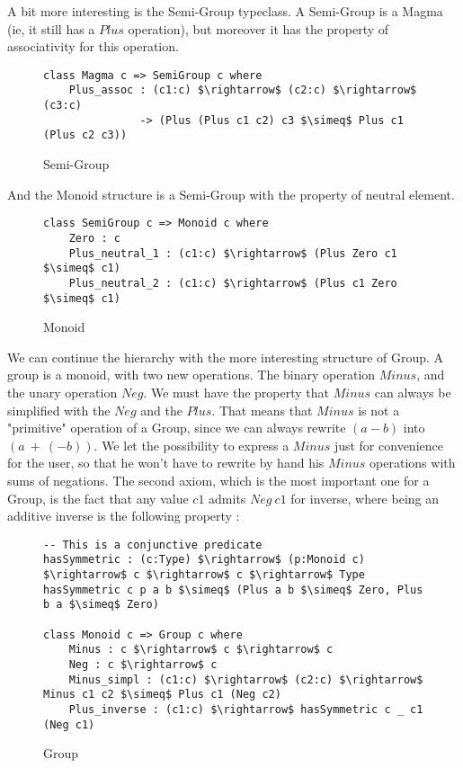 A bit more interesting is the Semi-Group typeclass. A Semi-Group is a Magma (ie, it still has a $Plus$ operation), but moreover it has the property of associativity for this operation.

\begin{figure}[H]
\figrule
\begin{center}
\begin{lstlisting}
class Magma c => SemiGroup c where
    Plus_assoc : (c1:c) $\rightarrow$ (c2:c) $\rightarrow$ (c3:c) 
               -> (Plus (Plus c1 c2) c3 $\simeq$ Plus c1 (Plus c2 c3))
\end{lstlisting}
\end{center}
\caption{Semi-Group}
\label{SemiGroup}
\figrule
\end{figure}

And the Monoid structure is a Semi-Group with the property of neutral element.

\begin{figure}[H]
\figrule
\begin{center}
\begin{lstlisting}
class SemiGroup c => Monoid c where
    Zero : c    
    Plus_neutral_1 : (c1:c) $\rightarrow$ (Plus Zero c1 $\simeq$ c1)    
    Plus_neutral_2 : (c1:c) $\rightarrow$ (Plus c1 Zero $\simeq$ c1)
\end{lstlisting}
\end{center}
\caption{Monoid}
\label{Monoid}
\figrule
\end{figure}
We can continue the hierarchy with the more interesting structure of Group.
A group is a monoid, with two new operations. The binary operation $Minus$, and the unary operation $Neg$. We must have the property that $Minus$ can always be simplified with the $Neg$ and the $Plus$. That means that $Minus$ is not a "primitive" operation of a Group, since we can always rewrite $(a-b)$ into $(a\ +\ (-b))$. We let the possibility to express a $Minus$ just for convenience for the user, so that he won't have to rewrite by hand his $Minus$ operations with sums of negations.
The second axiom, which is the most important one for a Group, is the fact that any value $c1$ admits $Neg\ c1$ for inverse, where being an additive inverse is the following property :

\begin{figure}[H]
\figrule
\begin{center}
\begin{lstlisting}
-- This is a conjunctive predicate
hasSymmetric : (c:Type) $\rightarrow$ (p:Monoid c) $\rightarrow$ c $\rightarrow$ c $\rightarrow$ Type
hasSymmetric c p a b $\simeq$ (Plus a b $\simeq$ Zero, Plus b a $\simeq$ Zero)    
  
class Monoid c => Group c where
    Minus : c $\rightarrow$ c $\rightarrow$ c
    Neg : c $\rightarrow$ c
    Minus_simpl : (c1:c) $\rightarrow$ (c2:c) $\rightarrow$ Minus c1 c2 $\simeq$ Plus c1 (Neg c2) 
    Plus_inverse : (c1:c) $\rightarrow$ hasSymmetric c _ c1 (Neg c1)
\end{lstlisting}
\end{center}
\caption{Group}
\label{Group}
\figrule
\end{figure}



